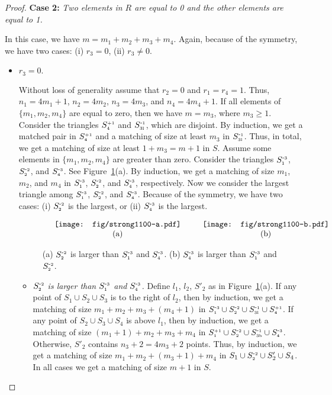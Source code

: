 \documentclass[11pt,a4paper]{article}
\newcommand{\SP}[2]{S^{\text{\tiny +#1}}_\text{\tiny #2}}
\newcommand{\SM}[2]{S^{\text{-\tiny #1}}_\text{\tiny #2}}
\begin{document}
\begin{proof}
{\bf Case 2:} {\em Two elements in $R$ are equal to 0 and the other elements are equal to 1.}

In this case, we have $m=m_1+m_2+m_3+m_4$. Again, because of the symmetry, we have two cases: (i) $r_3=0$, (ii) $r_3\neq 0$.

\begin{itemize}
 \item $r_3=0.$

Without loss of generality assume that $r_2=0$ and $r_1=r_4=1$. Thus, $n_1=4m_1+1$, $n_2=4m_2$, $n_3=4m_3$, and $n_4=4m_4+1$. If all elements of $\{m_1,m_2,m_4\}$ are equal to zero, then we have $m=m_3$, where $m_3\ge 1$. Consider the triangles $\SP{1}{4}$ and $\SM{1}{3l}$, which are disjoint. By induction, we get a matched pair in $\SP{1}{4}$ and a matching of size at least $m_3$ in $\SM{1}{3l}$. Thus, in total, we get a matching of size at least $1+m_3=m+1$ in $S$. Assume some elements in $\{m_1,m_2,m_4\}$ are greater than zero. Consider the triangles $\SM{3}{1}$, $\SM{2}{2}$, and $\SM{3}{4}$. See Figure~\ref{Theta-six-fig3}(a). By induction, we get a matching of size $m_1$, $m_2$, and $m_4$ in $\SM{3}{1}$, $\SM{2}{2}$, and $\SM{3}{4}$, respectively. 
Now we consider the largest triangle among $\SM{3}{1}$, $\SM{2}{2}$, and $\SM{3}{4}$. Because of the symmetry, we have two cases: (i) $\SM{2}{2}$ is the largest, or (ii) $\SM{3}{4}$ is the largest.

\begin{figure}[h!]
  \centering
\setlength{\tabcolsep}{0in}
  $\begin{tabular}{cc}
\multicolumn{1}{m{.5\columnwidth}}{\centering\texttt{[image: fig/strong1100-a.pdf]}}
&\multicolumn{1}{m{.5\columnwidth}}{\centering\texttt{[image: fig/strong1100-b.pdf]}}
\\
(a) & (b)
\end{tabular}$
  \caption{(a) $\SM{2}{2}$ is larger than $\SM{3}{1}$ and $\SM{3}{4}$. (b) $\SM{3}{4}$ is larger than $\SM{3}{1}$ and $\SM{2}{2}$.}
\label{Theta-six-fig3}
\end{figure}
\begin{itemize}
 \item {\em $\SM{2}{2}$ is larger than $\SM{3}{1}$ and $\SM{3}{4}$.}
Define $l_1$, $l_2$, $S'_2$ as in Figure~\ref{Theta-six-fig3}(a). If any point of $S_1\cup S_2\cup S_3$ is to the right of $l_2$, then by induction, we get a matching of size $m_1+m_2+m_3+(m_4+1)$ in $\SM{3}{1}\cup \SM{2}{2}\cup\SM{1}{3l}\cup \SP{1}{4}$. If any point of $S_2\cup S_3\cup S_4$ is above $l_1$, then by induction, we get a matching of size $(m_1+1)+m_2+m_3+m_4$ in $\SP{1}{1}\cup \SM{2}{2}\cup\SM{1}{3b}\cup \SM{3}{4}$. Otherwise, $S'_2$ contains $n_3+2=4m_3+2$ points. Thus, by induction, we get a matching of size $m_1+m_2+(m_3+1)+ m_4$ in $S_1\cup \SM{2}{2}\cup S'_2\cup S_4$. In all cases we get a matching of size $m+1$ in $S$.


\end{itemize}
\end{itemize}
\end{proof}
\end{document}
